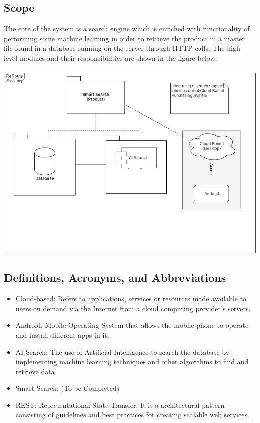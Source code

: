 \documentclass[a4paper,10pt]{article}
\begin{document}
	\subsection{Scope} 
	The core of the system is a search engine which is enriched with functionality
of performing some machine learning in order to retrieve the product in a master file found in a database running on the server through HTTP calls. The high level modules and their responsibilities are shown in the figure below. \\ \\
	\includegraphics[scale=0.62]{scope1.jpg}
	\subsection{Definitions, Acronyms, and Abbreviations} 

	\begin{itemize} 
	\item Cloud-based: Refers to applications, services or resources made available to users on demand via the Internet from a cloud computing provider's servers.
	\item Android: Mobile Operating System that allows the mobile phone to operate and install different apps in it.
	\item AI Search: The use of Artificial Intelligence to search the database by implementing machine learning techniques and other algorithms to find and retrieve data
	\item Smart Search: (To be Completed)
	\item REST: Representational State Transfer. It is a architectural pattern consisting of guidelines and best practices
for creating scalable web services.
	\end{itemize}
\end{document}
